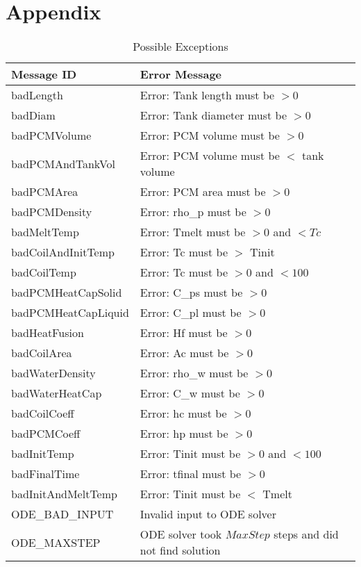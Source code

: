 \documentclass[12pt]{article}
\begin{document}
\section{Appendix} \label{Appendix}
\renewcommand{\arraystretch}{1.2}
\begin{longtable}{l p{12cm}}
\caption{Possible Exceptions} \\
\toprule
\textbf{Message ID} & \textbf{Error Message} \\
\midrule
badLength & Error: Tank length must be $> 0$ \\
badDiam & Error: Tank diameter must be $> 0$ \\
badPCMVolume & Error: PCM volume must be $> 0$ \\
badPCMAndTankVol & Error: PCM volume must be $<$ tank volume \\
badPCMArea & Error: PCM area must be $> 0$ \\
badPCMDensity & Error: rho\_p must be $> 0$ \\
badMeltTemp & Error: Tmelt must be $> 0$ and $< Tc$ \\
badCoilAndInitTemp & Error: Tc must be $>$ Tinit \\
badCoilTemp & Error: Tc must be $> 0$ and $< 100$ \\
badPCMHeatCapSolid & Error: C\_ps must be $> 0$ \\
badPCMHeatCapLiquid & Error: C\_pl must be $> 0$ \\
badHeatFusion & Error: Hf must be $> 0$ \\
badCoilArea & Error: Ac must be $> 0$ \\
badWaterDensity & Error: rho\_w must be $> 0$ \\
badWaterHeatCap & Error: C\_w must be $> 0$ \\
badCoilCoeff & Error: hc must be $> 0$ \\
badPCMCoeff & Error: hp must be $> 0$ \\
badInitTemp & Error: Tinit must be $> 0$ and $< 100$ \\
badFinalTime & Error: tfinal must be $> 0$ \\
badInitAndMeltTemp & Error: Tinit must be $<$ Tmelt \\
ODE\_BAD\_INPUT & Invalid input to ODE solver \\
ODE\_MAXSTEP & ODE solver took $MaxStep$ steps and did not find solution \\
\bottomrule
\end{longtable}
\end{document}
